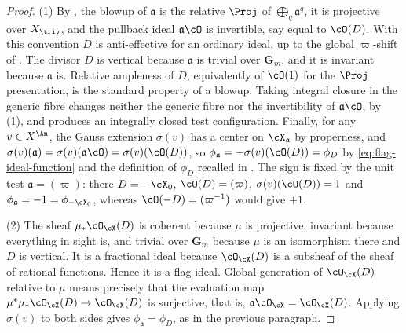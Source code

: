 \begin{proof}
(1)
By , the blowup of $\mathfrak a$ is the
relative $\Proj$ of $\bigoplus_q\mathfrak a^q$, it is projective over
$X_{\triv}$, and the pullback ideal $\mathfrak a\cO$ is invertible,
say equal to $\cO(D)$.  With this convention $D$ is anti-effective for
an ordinary ideal, up to the global $\varpi$-shift of
.  The divisor
$D$ is vertical because $\mathfrak a$ is trivial over
$\mathbf G_m$, and it is invariant because $\mathfrak a$ is.  Relative
ampleness of $D$, equivalently of $\cO(1)$ for the $\Proj$
presentation, is the standard property of a blowup.  Taking integral
closure in the generic fibre changes neither the generic fibre nor the
invertibility of $\mathfrak a\cO$, by
\,(1), and produces an integrally
closed test configuration.  Finally, for any $v\in X^{\An}$, the Gauss
extension $\sigma(v)$ has a center on $\cX_{\mathfrak a}$ by
properness, and $\sigma(v)(\mathfrak a)=\sigma(v)(\mathfrak a\cO)
=\sigma(v)(\cO(D))$, so
$\phi_{\mathfrak a}=-\sigma(v)(\cO(D))=\phi_D$ by
\eqref{eq:flag-ideal-function} and the definition
of $\phi_D$ recalled in .  The sign is
fixed by the unit test $\mathfrak a=(\varpi)$: there $D=-\cX_0$,
$\cO(D)=(\varpi)$, $\sigma(v)(\cO(D))=1$ and
$\phi_{\mathfrak a}=-1=\phi_{-\cX_0}$, whereas $\cO(-D)=(\varpi^{-1})$
would give $+1$.

(2)
The sheaf $\mu_\ast\cO_{\cX}(D)$ is coherent because $\mu$ is
projective, invariant because everything in sight is, and trivial over
$\mathbf G_m$ because $\mu$ is an isomorphism there and $D$ is
vertical.  It is a fractional ideal because $\cO_{\cX}(D)$ is a
subsheaf of the sheaf of rational functions.  Hence it is a flag ideal.
Global generation of $\cO_{\cX}(D)$ relative to $\mu$ means precisely
that the evaluation map
$\mu^\ast\mu_\ast\cO_{\cX}(D)\to\cO_{\cX}(D)$ is surjective, that is,
$\mathfrak a\cO_{\cX}=\cO_{\cX}(D)$.  Applying
$\sigma(v)$ to both sides gives $\phi_{\mathfrak a}=\phi_D$, as in the
previous paragraph.


\end{proof}
